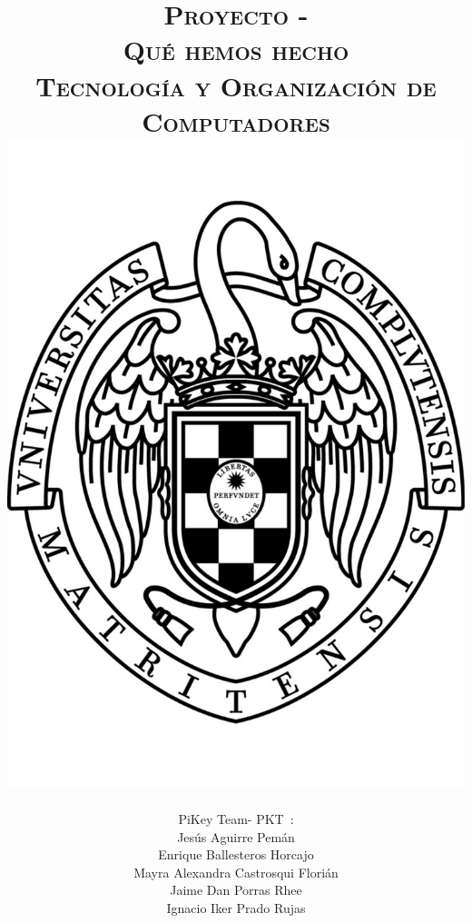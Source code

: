 \documentclass[11pt, a4paper, spanish, openright, twoside]{book}
\newcommand*{\PKT}{\hbox{P}\kern-2.5pt\lower3.5pt\hbox{\small{K}}\kern-2.8pt\hbox{T}\kern-2pt}	%
\begin{document}
 
\title{\Huge{\textsc{Proyecto -\\
	Qué hemos hecho}} \\
	\vspace{0.7cm}
	 \textsc{\Large{Tecnología y Organización de Computadores}} \\
	\includegraphics[scale=0.3]{ucm.pdf}}
\author{{\Large{PiKey Team-}} \PKT \ : \vspace{0.2cm} \\
	Jesús Aguirre Pemán \\
	 Enrique Ballesteros Horcajo \\
	 Mayra Alexandra Castrosqui Florián\\
	 Jaime Dan Porras Rhee \\
	 Ignacio Iker Prado Rujas}
\date{\Today}
\maketitle
\end{document}

